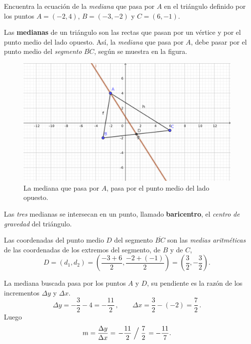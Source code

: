 \documentclass[12pt,letterpaper]{article}
\author{\textsc{Manuel López Mateos}}
\makeatletter
\let\elautor\@author
\makeatother
\begin{document}
%
\bigskip 

\noindent Encuentra la ecuación de la  \emph{\color{purple}mediana} que pasa por $A$ en el triángulo definido por los puntos $A=(-2,4)$, $B=(-3,-2)$ y $C=(6,-1)$.
\medskip

Las \textbf{\color{purple}medianas} de un triángulo son las rectas que pasan por un vértice y por el punto medio del lado opuesto. Así, la \emph{mediana} que pasa por $A$, debe pasar por el punto medio del \emph{segmento} $\overline{BC}$, según se muestra en la figura. 
\begin{figure}[ht]
\centering
\includegraphics[scale=0.4]{img/mediana-triang.png}
\caption{La mediana que pasa por $A$, pasa por el punto medio del lado opuesto.}\label{fig:mediana}
\end{figure}

Las \emph{tres} medianas se intersecan en un punto, llamado \textbf{\color{purple}baricentro}, el \emph{\color{purple}centro de gravedad} del triángulo.

Las coordenadas del punto medio $D$ del segmento $\overline{BC}$ son las \emph{\color{purple}medias aritméticas} de las coordenadas de los extremos del segmento, de $B$ y de $C$,
\begin{equation*}
D=(d_1,d_2)=\left(\frac{-3+6}{2},\frac{-2+(-1)}{2}\right) =\left(\frac{3}{2},-\frac{3}{2}\right).
\end{equation*} 

La mediana buscada pasa por los puntos $A$ y $D$, su pendiente es la razón de los incrementos $\Delta y$ y $\Delta x$.
\begin{equation*}
\Delta y = -\frac{3}{2}-4 = -\frac{11}{2}\,,\qquad
\Delta x = \frac{3}{2}-(-2) = \frac{7}{2}\,.
\end{equation*}
Luego
$$m=\frac{\Delta y}{\Delta x} = \left. -\frac{11}{2}\Bigm/\frac{7}{2}\right. = -\frac{11}{7}.$$
\end{document}
